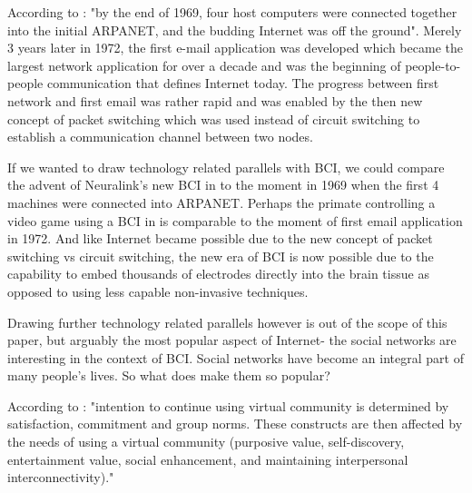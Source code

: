 \documentclass[fleqn,11pt]{olplainarticle}
\begin{document}
According to \cite{leiner2009brief}: "by the end of 1969, four host computers were
connected together into the initial ARPANET, and the budding Internet was off the ground". Merely 3 years later in 1972, the first e-mail application was developed which became the largest network application for over a decade and was the beginning of people-to-people communication that defines Internet today. The progress between first network and first email was rather rapid and was enabled by the then new concept of packet switching which was used instead of circuit switching to establish a communication channel between two nodes.

If we wanted to draw technology related parallels with BCI, we could compare the advent of Neuralink's new BCI in \cite{musk2019integrated} to the moment in 1969 when the first 4 machines were connected into ARPANET. Perhaps the primate controlling a video game using a BCI in \cite{wakefield_2020} is comparable to the moment of first email application in 1972. And like Internet became possible due to the new concept of packet switching vs circuit switching, the new era of BCI is now possible due to the capability to embed thousands of electrodes directly into the brain tissue as opposed to using less capable non-invasive techniques.

Drawing further technology related parallels however is out of the scope of this paper, but arguably the most popular aspect of Internet- the social networks are interesting in the context of BCI. Social networks have become an integral part of many people's lives. So what does make them so popular?

According to \cite{cheung2009understanding}: "intention to continue using virtual community is determined by satisfaction, commitment and group norms. These constructs are then affected by the needs of using a virtual community (purposive value, self-discovery, entertainment value, social enhancement, and maintaining interpersonal interconnectivity)."
\end{document}
